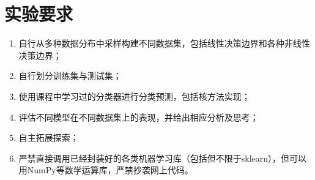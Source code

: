 
\section{实验要求}

\begin{enumerate}[1.]
    \item 自行从多种数据分布中采样构建不同数据集，包括线性决策边界和各种非线性决策边界；
    \item 自行划分训练集与测试集；
    \item 使用课程中学习过的分类器进行分类预测，包括核方法实现；
    \item 评估不同模型在不同数据集上的表现，并给出相应分析及思考；
    \item 自主拓展探索；
    \item 严禁直接调用已经封装好的各类机器学习库（包括但不限于sklearn），但可以用NumPy等数学运算库，严禁抄袭网上代码。

\end{enumerate}

